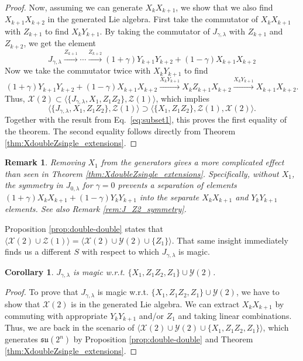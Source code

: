 \documentclass[12pt, a4-paper]{amsart}
\newcommand{\cX}{\mathcal{X}}
\newcommand{\cY}{\mathcal{Y}}
\newcommand{\cZ}{\mathcal{Z}}
\numberwithin{equation}{section}
\newtheorem{cor}[lemma]{Corollary}
\newtheorem{rem}[lemma]{Remark}
\begin{document}
\begin{proof}
    Now, assuming we can generate $X_k X_{k+1}$, we show that we also find $X_{k+1} X_{k+2}$ in the generated Lie algebra. First take the commutator of $X_k X_{k+1}$ with $Z_{k+1}$ to find $X_k Y_{k+1}$. By taking the commutator of $J_{\gamma, \lambda}$ with $Z_{k+1}$ and $Z_{k+2}$, we get the element
    \begin{equation}
        J_{\gamma, \lambda} \stackrel{Z_{k+1}}{\longrightarrow} \cdots \stackrel{Z_{k+2}}{\longrightarrow}  (1+\gamma) Y_{k+1} Y_{k+2} + (1-\gamma) X_{k+1} X_{k+2}
    \end{equation}
    Now we take the commutator twice with $X_k Y_{k+1}$ to find
    \begin{equation}
        (1+\gamma) Y_{k+1} Y_{k+2} + (1-\gamma) X_{k+1} X_{k+2} \stackrel{X_k Y_{k+1}}{\longrightarrow} X_k Z_{k+1} X_{k+2} \stackrel{X_k Y_{k+1}}{\longrightarrow} X_{k+1} X_{k+2}.
    \end{equation}
    Thus, $\cX(2) \subset \langle \{J_{\gamma, \lambda}, X_1, Z_1 Z_2 \}, \cZ(1) \rangle$, which implies 
    \begin{equation}
        \langle \{J_{\gamma, \lambda}, X_1, Z_1 Z_2 \}, \cZ(1) \rangle \supset \langle \{X_1, Z_1 Z_2 \}, \cZ(1), \cX(2) \rangle.
    \end{equation}
    Together with the result from Eq.~\eqref{eq:subset1}, this proves the first equality of the theorem. The second equality follows directly from Theorem \ref{thm:XdoubleZsingle_extensions}.
\end{proof}


\begin{rem}
    Removing $X_1$ from the generators gives a more complicated effect than seen in Theorem 
 \ref{thm:XdoubleZsingle_extensions}. Specifically, without $X_1$, the symmetry in $J_{0,\lambda}$ for $\gamma = 0$ prevents a separation of elements $(1+\gamma) X_k X_{k+1} + (1-\gamma) Y_k Y_{k+1}$ into the separate $X_k X_{k+1}$ and $Y_k Y_{k+1}$ elements. See also Remark \ref{rem:J_Z2_symmetry}.
\end{rem}

Proposition \ref{prop:double-double} states that $\langle \cX(2) \cup \cZ(1)\rangle = \langle\cX(2) \cup \cY(2)\cup \{Z_1\}\rangle$. That same insight immediately finds us a different $S$ with respect to which $J_{\gamma, \lambda}$ is magic.
\begin{cor}
     $J_{\gamma, \lambda}$ is magic w.r.t. $\{X_1, Z_1 Z_2, Z_1\}\cup \cY(2)$.
\end{cor}
\begin{proof}
    To prove that $J_{\gamma, \lambda}$ is magic w.r.t. $\{X_1, Z_1 Z_2, Z_1\}\cup \cY(2)$, we have to show that $\cX(2)$ is in the generated Lie algebra. We can extract $X_k X_{k+1}$ by commuting with appropriate $Y_k Y_{k+1}$ and/or $Z_1$ and taking linear combinations. Thus, we are back in the scenario of $\langle \cX(2) \cup \cY(2) \cup \{X_1, Z_1 Z_2, Z_1\}\rangle$, which generates $\mathfrak{su}(2^n)$ by Proposition \ref{prop:double-double} and Theorem \ref{thm:XdoubleZsingle_extensions}.
\end{proof}
    
\end{document}
